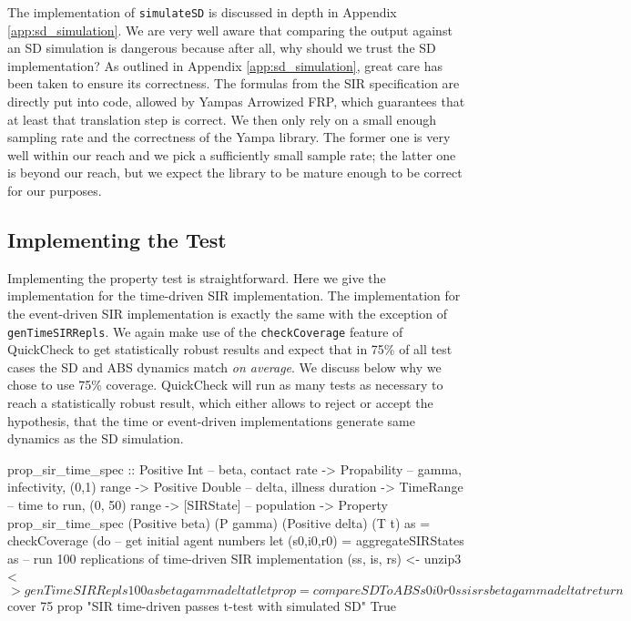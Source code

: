 The implementation of \texttt{simulateSD} is discussed in depth in Appendix \ref{app:sd_simulation}. We are very well aware that comparing the output against an SD simulation is dangerous because after all, why should we trust the SD implementation? As outlined in Appendix \ref{app:sd_simulation}, great care has been taken to ensure its correctness. The formulas from the SIR specification are directly put into code, allowed by Yampas Arrowized FRP, which guarantees that at least that translation step is correct. We then only rely on a small enough sampling rate and the correctness of the Yampa library. The former one is very well within our reach and we pick a sufficiently small sample rate; the latter one is beyond our reach, but we expect the library to be mature enough to be correct for our purposes.

\subsection{Implementing the Test}
Implementing the property test is straightforward. Here we give the implementation for the time-driven SIR implementation. The implementation for the event-driven SIR implementation is exactly the same with the exception of \texttt{genTimeSIRRepls}. We again make use of the \texttt{checkCoverage} feature of QuickCheck to get statistically robust results and expect that in 75\% of all test cases the SD and ABS dynamics match \textit{on average}. We discuss below why we chose to use 75\% coverage. QuickCheck will run as many tests as necessary to reach a statistically robust result, which either allows to reject or accept the hypothesis, that the time or event-driven implementations generate same dynamics as the SD simulation.

\begin{HaskellCode}
prop_sir_time_spec :: Positive Int    -- beta, contact rate
                   -> Propability     -- gamma, infectivity, (0,1) range
                   -> Positive Double -- delta, illness duration
                   -> TimeRange       -- time to run, (0, 50) range
                   -> [SIRState]      -- population
                   -> Property
prop_sir_time_spec 
    (Positive beta) (P gamma) (Positive delta) (T t) as = checkCoverage (do
  -- get initial agent numbers
  let (s0,i0,r0) = aggregateSIRStates as
  -- run 100 replications of time-driven SIR implementation
  (ss, is, rs) <- unzip3 <$> genTimeSIRRepls 100 as beta gamma delta t
  let prop = compareSDToABS s0 i0 r0 ss is rs beta gamma delta t
  return $ cover 75 prop "SIR time-driven passes t-test with simulated SD" True
\end{HaskellCode}

